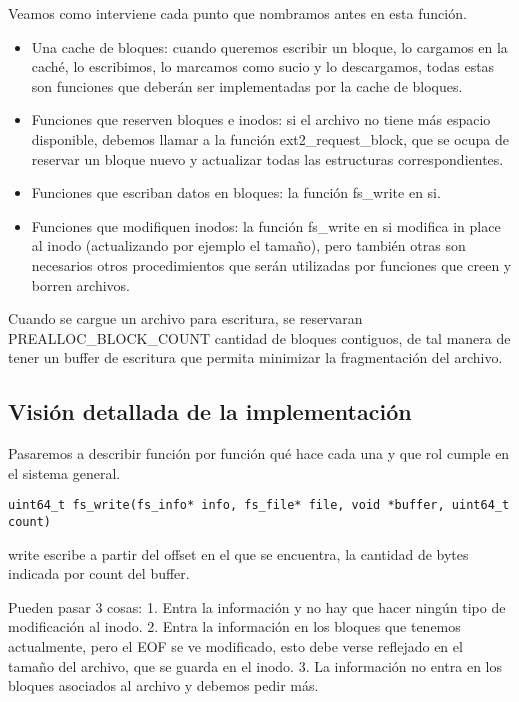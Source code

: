 Veamos como interviene cada punto que nombramos antes en esta función.

\begin{itemize}
  \item Una cache de bloques: cuando queremos escribir un bloque, lo cargamos en la caché, lo escribimos, lo marcamos como sucio y lo descargamos, todas estas son funciones que deberán ser implementadas por la cache de bloques.
  \item Funciones que reserven bloques e inodos: si el archivo no tiene más espacio disponible, debemos llamar a la función ext2\_request\_block, que se ocupa de reservar un bloque nuevo y actualizar todas las estructuras correspondientes.
  \item Funciones que escriban datos en bloques: la función fs\_write en si.
  \item Funciones que modifiquen inodos: la función fs\_write en si modifica in place al inodo (actualizando por ejemplo el tamaño), pero también otras son necesarios otros procedimientos que serán utilizadas por funciones que creen y borren archivos.
\end{itemize}


Cuando se cargue un archivo para escritura, se reservaran PREALLOC\_BLOCK\_COUNT cantidad de bloques contiguos, de tal manera de tener un buffer de escritura que permita minimizar la fragmentación del archivo.

\subsection{Visión detallada de la implementación}

Pasaremos a describir función por función qu\'e hace cada una y que rol cumple en el sistema general.

\begin{lstlisting}[style=customc]
uint64_t fs_write(fs_info* info, fs_file* file, void *buffer, uint64_t count)
\end{lstlisting}

write escribe a partir del offset en el que se encuentra, la cantidad de bytes indicada por count del buffer.

Pueden pasar 3 cosas:
1. Entra la información y no hay que hacer ningún tipo de modificación al inodo.
2. Entra la información en los bloques que tenemos actualmente, pero el EOF se ve modificado, esto debe verse reflejado en el tamaño del archivo, que se guarda en el inodo.
3. La información no entra en los bloques asociados al archivo y debemos pedir más.

